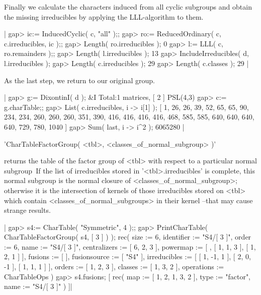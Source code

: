 Finally we calculate the characters induced from all cyclic subgroups and
obtain the missing irreducibles by applying the LLL-algorithm to them.

|    gap> ic:= InducedCyclic( c, "all" );;
    gap> ro:= ReducedOrdinary( c, c.irreducibles, ic );;
    gap> Length( ro.irreducibles );
    0
    gap> l:= LLL( c, ro.remainders );;
    gap> Length( l.irreducibles );
    13
    gap> IncludeIrreducibles( d, l.irreducibles );
    gap> Length( c.irreducibles );
    29
    gap> Length( c.classes );
    29 |

As the last step, we return to our original group.

|    gap> g:= DixontinI( d );
    &I  Total:1 matrices, [ 2 ]
    PSL(4,3)
    gap> c:= g.charTable;;
    gap> List( c.irreducibles, i -> i[1] );
    [ 1, 26, 26, 39, 52, 65, 65, 90, 234, 234, 260, 260, 260, 351, 390,
      416, 416, 416, 416, 468, 585, 585, 640, 640, 640, 640, 729, 780,
      1040 ]
    gap> Sum( last, i -> i^2 );
    6065280 |


%
%

'CharTableFactorGroup( <tbl>, <classes\_of\_normal\_subgroup> )'

returns the table of the factor group of <tbl> with respect to a
particular normal subgroup\:\ If the list of irreducibles stored in
'<tbl>.irreducibles' is complete, this normal subgroup is the normal
closure of <classes\_of\_normal\_subgroup>;
otherwise it is the intersection of kernels of those irreducibles stored
on <tbl> which contain <classes\_of\_normal\_subgroups> in their kernel
--that may cause strange results.

|    gap> s4:= CharTable( "Symmetric", 4 );;
    gap> PrintCharTable( CharTableFactorGroup( s4, [ 3 ] ) );
    rec( size := 6, identifier := "S4/[ 3 ]", order :=
    6, name := "S4/[ 3 ]", centralizers := [ 6, 2, 3 ], powermap :=
    [ , [ 1, 1, 3 ], [ 1, 2, 1 ] ], fusions := [  ], fusionsource :=
    [ "S4" ], irreducibles := [ [ 1, -1, 1 ], [ 2, 0, -1 ], [ 1, 1, 1 ]
     ], orders := [ 1, 2, 3 ], classes :=
    [ 1, 3, 2 ], operations := CharTableOps )
    gap> s4.fusions;
    [ rec(
          map := [ 1, 2, 1, 3, 2 ],
          type := "factor",
          name := "S4/[ 3 ]" ) ]|

%
%

